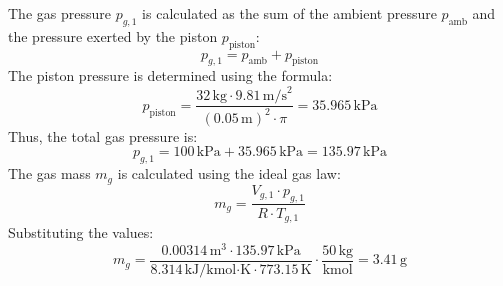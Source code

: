 The gas pressure \( p_{g,1} \) is calculated as the sum of the ambient pressure \( p_{\text{amb}} \) and the pressure exerted by the piston \( p_{\text{piston}} \):  
\[
p_{g,1} = p_{\text{amb}} + p_{\text{piston}}
\]  
The piston pressure is determined using the formula:  
\[
p_{\text{piston}} = \frac{32 \, \text{kg} \cdot 9.81 \, \text{m/s}^2}{\left(0.05 \, \text{m}\right)^2 \cdot \pi} = 35.965 \, \text{kPa}
\]  
Thus, the total gas pressure is:  
\[
p_{g,1} = 100 \, \text{kPa} + 35.965 \, \text{kPa} = 135.97 \, \text{kPa}
\]  
The gas mass \( m_g \) is calculated using the ideal gas law:  
\[
m_g = \frac{V_{g,1} \cdot p_{g,1}}{R \cdot T_{g,1}}
\]  
Substituting the values:  
\[
m_g = \frac{0.00314 \, \text{m}^3 \cdot 135.97 \, \text{kPa}}{8.314 \, \text{kJ}/\text{kmol·K} \cdot 773.15 \, \text{K}} \cdot \frac{50 \, \text{kg}}{\text{kmol}} = 3.41 \, \text{g}
\]